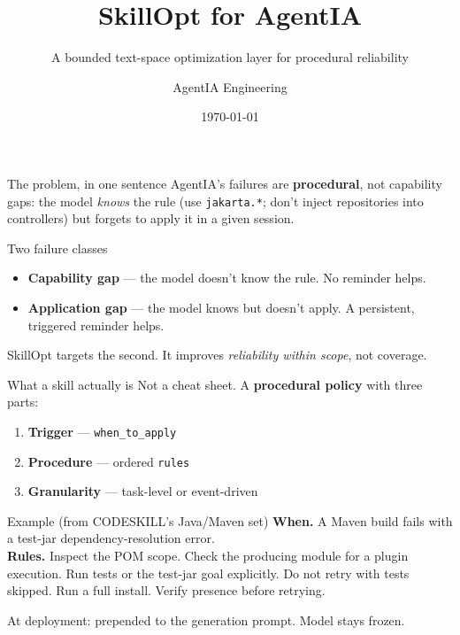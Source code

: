 \documentclass[aspectratio=169,11pt]{beamer}
\title{SkillOpt for AgentIA}
\subtitle{A bounded text-space optimization layer for procedural reliability}
\author{AgentIA Engineering}
\date{\today}
\begin{document}
\begin{frame}
  \titlepage
\end{frame}

\begin{frame}{The problem, in one sentence}
  AgentIA's failures are \textbf{procedural}, not capability gaps:
  the model \emph{knows} the rule (use \texttt{jakarta.*}; don't inject
  repositories into controllers) but forgets to apply it in a given
  session.

  \vspace{0.6em}
  \begin{block}{Two failure classes}
  \begin{itemize}
    \item \textbf{Capability gap} --- the model doesn't know the rule.
    No reminder helps.
    \item \textbf{Application gap} --- the model knows but doesn't apply.
    A persistent, triggered reminder helps.
  \end{itemize}
  \end{block}

  \vspace{0.4em}
  SkillOpt targets the second. It improves \emph{reliability within
  scope}, not coverage.
\end{frame}

\begin{frame}{What a skill actually is}
  Not a cheat sheet. A \textbf{procedural policy} with three parts:

  \begin{enumerate}
    \item \textbf{Trigger} --- \texttt{when\_to\_apply}
    \item \textbf{Procedure} --- ordered \texttt{rules}
    \item \textbf{Granularity} --- task-level or event-driven
  \end{enumerate}

  \vspace{0.6em}
  \begin{block}{Example (from CODESKILL's Java/Maven set)}
  \small
  \textbf{When.} A Maven build fails with a test-jar
  dependency-resolution error.\\
  \textbf{Rules.} Inspect the POM scope. Check the producing module for a
  plugin execution. Run tests or the test-jar goal explicitly. Do not
  retry with tests skipped. Run a full install. Verify presence before
  retrying.
  \end{block}

  \vspace{0.3em}
  At deployment: prepended to the generation prompt. Model stays frozen.
\end{frame}
\end{document}

